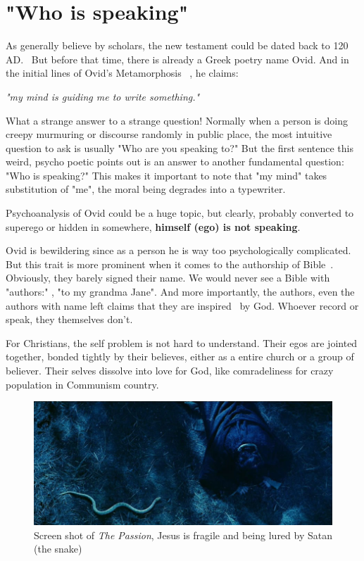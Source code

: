 \documentclass[]{article}
\begin{document}
\section{"Who is speaking"}

As generally believe by scholars, the new testament could be dated back to 120 AD.~\cite{ehrman1997new} But before that time, there is already a Greek poetry name Ovid. And in the initial lines of Ovid's Metamorphosis ~\cite{simpson2003metamorphoses}, he claims:

\textit{"my mind is guiding me to write something."}

What a strange answer to a strange question! Normally when a person is doing creepy murmuring or discourse randomly in public place, the most intuitive question to ask is usually "Who are you speaking to?" But the first sentence this weird, psycho poetic points out is an answer to another fundamental question: "Who is speaking?" This makes it important to note that "my mind" takes substitution of "me", the moral being degrades into a typewriter. 

Psychoanalysis of Ovid could be a huge topic, but clearly, probably converted to superego or hidden in somewhere, \textbf{himself (ego) is not speaking}. 

Ovid is bewildering since as a person he is way too psychologically complicated. But this trait is more prominent when it comes to the authorship of Bible~\cite{wiki:xxx}. Obviously, they barely signed their name. We would never see a Bible with "authors:" , "to my grandma Jane". And more importantly, the authors, even the authors with name left claims that they are inspired~\cite{warfield1948inspiration} by God. Whoever record or speak, they themselves don't.

For Christians, the self problem is not hard to understand. Their egos are jointed together, bonded tightly by their believes, either as a entire church or a group of believer. Their selves dissolve into love for God, like comradeliness for crazy population in Communism country.

\begin{figure}
	\centering
	\includegraphics[width=0.8\linewidth]{passion}
	\caption{Screen shot of \textit{The Passion}, Jesus is fragile and being lured by Satan (the snake)}
	\label{fig:passoin}
\end{figure}
\end{document}
